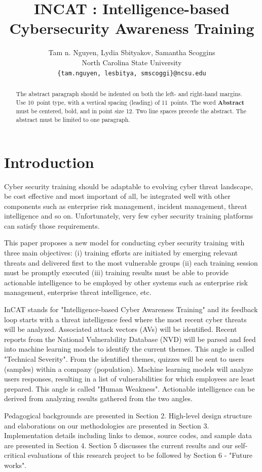 \documentclass{article} %
\title{INCAT : Intelligence-based Cybersecurity Awareness Training}
\author{
Tam n. Nguyen, Lydia Sbityakov, Samantha Scoggins\\
North Carolina State University\\
\texttt{\{tam.nguyen, lesbitya, smscoggi\}@ncsu.edu} \\
}
\begin{document}
\maketitle

\begin{abstract}
  The abstract paragraph should be indented  on both the left- and right-hand margins. Use 10~point
  type, with a vertical spacing (leading) of 11~points.  The word
  \textbf{Abstract} must be centered, bold, and in point size 12. Two
  line spaces precede the abstract. The abstract must be limited to
  one paragraph.
\end{abstract}

\section{Introduction}
Cyber security training should be adaptable to evolving cyber threat landscape, be cost effective and most important of all, be integrated well with other components such as enterprise risk management, incident management, threat intelligence and so on. Unfortunately, very few cyber security training platforms can satisfy those requirements.

This paper proposes a new model for conducting cyber security training with three main objectives: (i) training efforts are initiated by emerging relevant threats and delivered first to the most vulnerable groups (ii) each training session must be promptly executed (iii) training results must be able to provide actionable intelligence to be employed by other systems such as enterprise risk management, enterprise threat intelligence, etc.

InCAT stands for "Intelligence-based Cyber Awareness Training" and its feedback loop starts with a threat intelligence feed where the most recent cyber threats will be analyzed. Associated attack vectors (AVs) will be identified. Recent reports from the National Vulnerability Database (NVD) will be parsed and feed into machine learning models to identify the current themes. This angle is called "Technical Severity". From the identified themes, quizzes will be sent to users (samples) within a company (population). Machine learning models will analyze users responses, resulting in a list of vulnerabilities for which employees are least prepared. This angle is called "Human Weakness". Actionable intelligence can be derived from analyzing results gathered from the two angles.

Pedagogical backgrounds are presented in Section 2. High-level design structure and elaborations on our methodologies are presented in Section 3. Implementation details including links to demos, source codes, and sample data are presented in Section 4. Section 5 discusses the current results and our self-critical evaluations of this research project to be followed by Section 6 - "Future works".
\end{document}
